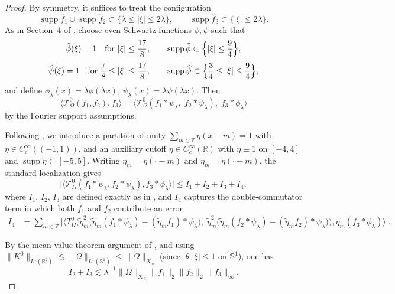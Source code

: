 \documentclass[11pt]{amsart}
\begin{document}
\begin{proof}
	By symmetry, it suffices to treat the configuration
	\[
	\operatorname{supp}\widehat f_1\cup \operatorname{supp}\widehat f_2
	\subset \{\lambda\le |\xi|\le 2\lambda\},
	\qquad
	\operatorname{supp}\widehat f_3\subset \{|\xi|\le 2\lambda\}.
	\]
	As in Section~4 of \cite{bhojak2025alternate}, choose even Schwartz functions $\phi,\psi$ such that
	\[
	\widehat\phi(\xi)=1 \quad \text{for } |\xi|\le \frac{17}{8},
	\qquad
	\operatorname{supp}\widehat\phi\subset \Bigl\{|\xi|\le \frac94\Bigr\},
	\]
	\[
	\widehat\psi(\xi)=1 \quad \text{for } \frac78\le |\xi|\le \frac{17}{8},
	\qquad
	\operatorname{supp}\widehat\psi\subset \Bigl\{\frac34\le |\xi|\le \frac94\Bigr\},
	\]
	and define $\phi_\lambda(x)=\lambda\phi(\lambda x)$, $\psi_\lambda(x)=\lambda\psi(\lambda x)$.
	Then
	\begin{equation}\label{eqfreq-reduction}
		\langle \mathcal {T}_\Omega^0(f_1,f_2),f_3\rangle
		=
		\langle \mathcal {T}_\Omega^0(f_1*\psi_\lambda,\;f_2*\psi_\lambda),\;f_3*\phi_\lambda\rangle
	\end{equation}
	by the Fourier support assumptions.
	
	Following \cite[Section~4.1]{bhojak2025alternate}, we introduce a partition of
	unity $\sum_{m\in\mathbb Z}\eta(x-m)=1$ with $\eta\in C_c^\infty((-1,1))$,
	and an auxiliary cutoff $\widetilde\eta\in C_c^\infty(\mathbb R)$ with
	$\widetilde\eta\equiv 1$ on $[-4,4]$ and $\operatorname{supp}\widetilde\eta
	\subset[-5,5]$. Writing $\eta_m=\eta(\cdot-m)$ and
	$\widetilde\eta_m=\widetilde\eta(\cdot-m)$, the standard localization gives
	\[
	\big|\langle \mathcal{T}_\Omega^0(f_1*\psi_\lambda,f_2*\psi_\lambda),
	f_3*\phi_\lambda\rangle\big|
	\le I_1+I_2+I_3+I_4,
	\]
	where $I_1$, $I_2$, $I_3$ are defined exactly as in
	\cite[Section~4.1]{bhojak2025alternate}, and $I_4$ captures the
	double-commutator term in which both $f_1$ and $f_2$ contribute an error
	\begin{align*}
		I_4 &= \sum_{m\in\mathbb{Z}} \bigg|\bigg\langle T_{\Omega}^0\Big(
		\widetilde{\eta}_{m}^2\big(\widetilde{\eta}_{m}(f_1\ast\psi_{\lambda})
		-(\widetilde{\eta}_{m}f_1)\ast\psi_{\lambda}\big),\;
		\widetilde{\eta}_{m}^2\big(\widetilde{\eta}_{m}(f_2\ast\psi_{\lambda})
		-(\widetilde{\eta}_{m}f_2)\ast\psi_{\lambda}\big)\Big),
		\eta_m(f_3\ast\phi_{\lambda})\bigg\rangle\bigg|.
	\end{align*}
	
	By the mean-value-theorem argument of \cite[Section~4.1]{bhojak2025alternate},
	and using $\|K^0\|_{L^1(\mathbb R^2)}\lesssim\|\Omega\|_{L^1(\mathbb S^1)}
	\le\|\Omega\|_{\mathcal K_a}$ (since $|\theta\cdot\xi|\le 1$ on $\mathbb S^1$),
	one has
	\begin{equation}\label{eqI23-final}
		I_2+I_3
		\lesssim
		\lambda^{-1}\|\Omega\|_{\mathcal K_a}\|f_1\|_2\|f_2\|_2\|f_3\|_\infty.
	\end{equation}
	

\end{proof}
\end{document}
